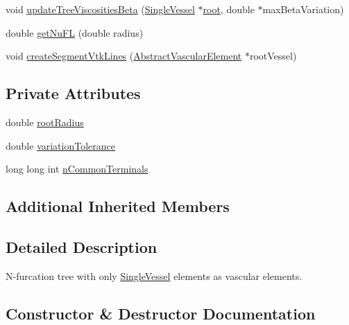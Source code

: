 \begin{DoxyCompactItemize}
\item 
void \hyperlink{class_single_vessel_c_c_o_o_tree_a08fc003426f3a8697af2f57d03a702c9}{update\+Tree\+Viscosities\+Beta} (\hyperlink{class_single_vessel}{Single\+Vessel} $\ast$\hyperlink{class_abstract_object_c_c_o_tree_ae1b17938ad34d92629915159c49bb89a}{root}, double $\ast$max\+Beta\+Variation)
\item 
double \hyperlink{class_single_vessel_c_c_o_o_tree_a125eba238125b220cb021829603e6e97}{get\+Nu\+FL} (double radius)
\item 
void \hyperlink{class_single_vessel_c_c_o_o_tree_ac213538ea943f22310f6c20e47a72170}{create\+Segment\+Vtk\+Lines} (\hyperlink{class_abstract_vascular_element}{Abstract\+Vascular\+Element} $\ast$root\+Vessel)
\end{DoxyCompactItemize}
\subsection*{Private Attributes}
\begin{DoxyCompactItemize}
\item 
double \hyperlink{class_single_vessel_c_c_o_o_tree_a92984c132be3e2eaed34adfc261afa48}{root\+Radius}
\item 
double \hyperlink{class_single_vessel_c_c_o_o_tree_abd14cc5350019a67cc3f8ff881af58e4}{variation\+Tolerance}
\item 
long long int \hyperlink{class_single_vessel_c_c_o_o_tree_a9766e247e4414d77c9a50ed4d09b3138}{n\+Common\+Terminals}
\end{DoxyCompactItemize}
\subsection*{Additional Inherited Members}


\subsection{Detailed Description}
N-\/furcation tree with only \hyperlink{class_single_vessel}{Single\+Vessel} elements as vascular elements. 

\subsection{Constructor \& Destructor Documentation}
